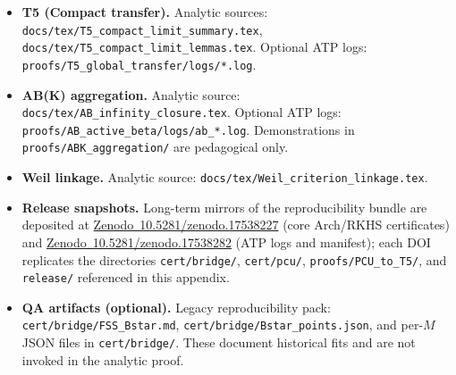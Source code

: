 \begin{itemize}[leftmargin=2.2em]
  \item \textbf{T5 (Compact transfer).} Analytic sources: \texttt{docs/tex/T5\_compact\_limit\_summary.tex}, \texttt{docs/tex/T5\_compact\_limit\_lemmas.tex}. Optional ATP logs: \texttt{proofs/T5\_global\_transfer/logs/*.log}.

  \item \textbf{AB(K) aggregation.}\label{subsec:ab-atp} Analytic source: \texttt{docs/tex/AB\_infinity\_closure.tex}. Optional ATP logs: \texttt{proofs/AB\_active\_beta/logs/ab\_*.log}. Demonstrations in \texttt{proofs/ABK\_aggregation/} are pedagogical only.

  \item \textbf{Weil linkage.} Analytic source: \texttt{docs/tex/Weil\_criterion\_linkage.tex}.

  \item \textbf{Release snapshots.} Long-term mirrors of the reproducibility bundle are deposited at \href{https://doi.org/10.5281/zenodo.17538227}{Zenodo~10.5281/zenodo.17538227} (core Arch/RKHS certificates) and \href{https://doi.org/10.5281/zenodo.17538282}{Zenodo~10.5281/zenodo.17538282} (ATP logs and manifest); each DOI replicates the directories \texttt{cert/bridge/}, \texttt{cert/pcu/}, \texttt{proofs/PCU\_to\_T5/}, and \texttt{release/} referenced in this appendix.

  \item \textbf{QA artifacts (optional).} Legacy reproducibility pack: \texttt{cert/bridge/FSS\_Bstar.md}, \texttt{cert/bridge/Bstar\_points.json}, and per-$M$ JSON files in \texttt{cert/bridge/}. These document historical fits and are not invoked in the analytic proof.
\end{itemize}

